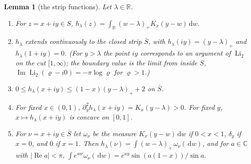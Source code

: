 \documentclass[11pt]{amsart}
\newtheorem{lemma}[theorem]{Lemma}
\theoremstyle{definition}
\theoremstyle{remark}
\numberwithin{equation}{section}
\newcommand{\R}{\mathbb{R}}
\newcommand{\C}{\mathbb{C}}
\renewcommand{\Re}{\operatorname{Re}}
\renewcommand{\Im}{\operatorname{Im}}
\newcommand{\Li}{\operatorname{Li}_2}
\newcommand{\dd}{\,\mathrm{d}}
\begin{document}
\begin{lemma}[the strip functions]\label{lem:h}
Let $\lambda\in\R$.
\begin{enumerate}
\item For $z=x+iy\in S$, $h_\lambda(z)=\int_\R(w-\lambda)_+K_x(y-w)\dd w$.
\item $h_\lambda$ extends continuously to the closed strip $\bar S$, with $h_\lambda(iy)=(y-\lambda)_+$ and
$h_\lambda(1+iy)=0$. (For $y>\lambda$ the point $iy$ corresponds to an argument of $\Li$ on the cut $[1,\infty)$; the
boundary value is the limit from inside $S$, $\Im\Li(\varrho-i0)=-\pi\log\varrho$ for $\varrho>1$.)
\item $0\le h_\lambda(x+iy)\le(1-x)(y-\lambda)_++2$ on $\bar S$.
\item For fixed $x\in(0,1)$, $\partial_y^2h_\lambda(x+iy)=K_x(y-\lambda)>0$. For fixed $y$, $x\mapsto h_\lambda(x+iy)$ is
concave on $[0,1]$.
\item For $\nu=x+iy\in\bar S$ let $\omega_\nu$ be the measure $K_x(y-w)\dd w$ if $0<x<1$, $\delta_y$ if $x=0$, and $0$ if
$x=1$. Then $h_\lambda(\nu)=\int(w-\lambda)_+\,\omega_\nu(\dd w)$, and for $a\in\C$ with $|\Re a|<\pi$,
$\int e^{aw}\omega_\nu(\dd w)=e^{ay}\sin(a(1-x))/\sin a$.
\end{enumerate}
\end{lemma}
\end{document}
